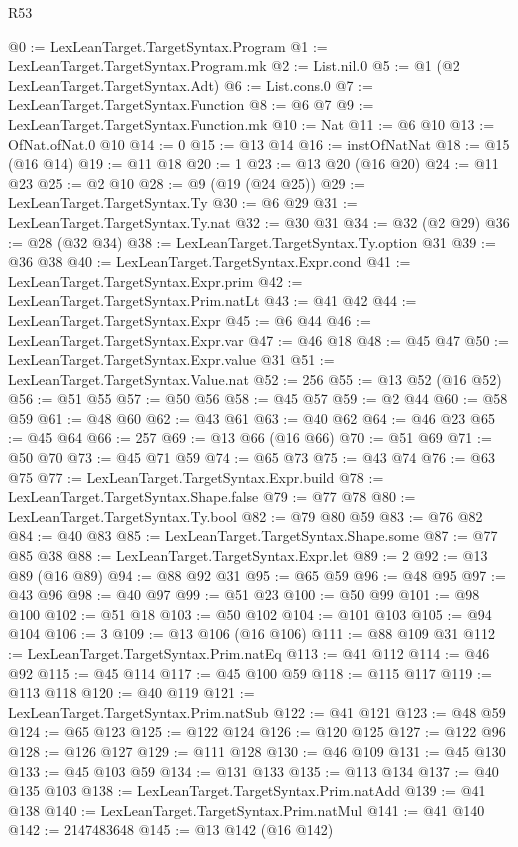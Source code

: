 \begin{lexlean}{R53}
\begin{coremodule}
@0 := LexLeanTarget.TargetSyntax.Program
@1 := LexLeanTarget.TargetSyntax.Program.mk
@2 := List.nil.{0}
@5 := @1 (@2 LexLeanTarget.TargetSyntax.Adt)
@6 := List.cons.{0}
@7 := LexLeanTarget.TargetSyntax.Function
@8 := @6 @7
@9 := LexLeanTarget.TargetSyntax.Function.mk
@10 := Nat
@11 := @6 @10
@13 := OfNat.ofNat.{0} @10
@14 := 0
@15 := @13 @14
@16 := instOfNatNat
@18 := @15 (@16 @14)
@19 := @11 @18
@20 := 1
@23 := @13 @20 (@16 @20)
@24 := @11 @23
@25 := @2 @10
@28 := @9 (@19 (@24 @25))
@29 := LexLeanTarget.TargetSyntax.Ty
@30 := @6 @29
@31 := LexLeanTarget.TargetSyntax.Ty.nat
@32 := @30 @31
@34 := @32 (@2 @29)
@36 := @28 (@32 @34)
@38 := LexLeanTarget.TargetSyntax.Ty.option @31
@39 := @36 @38
@40 := LexLeanTarget.TargetSyntax.Expr.cond
@41 := LexLeanTarget.TargetSyntax.Expr.prim
@42 := LexLeanTarget.TargetSyntax.Prim.natLt
@43 := @41 @42
@44 := LexLeanTarget.TargetSyntax.Expr
@45 := @6 @44
@46 := LexLeanTarget.TargetSyntax.Expr.var
@47 := @46 @18
@48 := @45 @47
@50 := LexLeanTarget.TargetSyntax.Expr.value @31
@51 := LexLeanTarget.TargetSyntax.Value.nat
@52 := 256
@55 := @13 @52 (@16 @52)
@56 := @51 @55
@57 := @50 @56
@58 := @45 @57
@59 := @2 @44
@60 := @58 @59
@61 := @48 @60
@62 := @43 @61
@63 := @40 @62
@64 := @46 @23
@65 := @45 @64
@66 := 257
@69 := @13 @66 (@16 @66)
@70 := @51 @69
@71 := @50 @70
@73 := @45 @71 @59
@74 := @65 @73
@75 := @43 @74
@76 := @63 @75
@77 := LexLeanTarget.TargetSyntax.Expr.build
@78 := LexLeanTarget.TargetSyntax.Shape.false
@79 := @77 @78
@80 := LexLeanTarget.TargetSyntax.Ty.bool
@82 := @79 @80 @59
@83 := @76 @82
@84 := @40 @83
@85 := LexLeanTarget.TargetSyntax.Shape.some
@87 := @77 @85 @38
@88 := LexLeanTarget.TargetSyntax.Expr.let
@89 := 2
@92 := @13 @89 (@16 @89)
@94 := @88 @92 @31
@95 := @65 @59
@96 := @48 @95
@97 := @43 @96
@98 := @40 @97
@99 := @51 @23
@100 := @50 @99
@101 := @98 @100
@102 := @51 @18
@103 := @50 @102
@104 := @101 @103
@105 := @94 @104
@106 := 3
@109 := @13 @106 (@16 @106)
@111 := @88 @109 @31
@112 := LexLeanTarget.TargetSyntax.Prim.natEq
@113 := @41 @112
@114 := @46 @92
@115 := @45 @114
@117 := @45 @100 @59
@118 := @115 @117
@119 := @113 @118
@120 := @40 @119
@121 := LexLeanTarget.TargetSyntax.Prim.natSub
@122 := @41 @121
@123 := @48 @59
@124 := @65 @123
@125 := @122 @124
@126 := @120 @125
@127 := @122 @96
@128 := @126 @127
@129 := @111 @128
@130 := @46 @109
@131 := @45 @130
@133 := @45 @103 @59
@134 := @131 @133
@135 := @113 @134
@137 := @40 @135 @103
@138 := LexLeanTarget.TargetSyntax.Prim.natAdd
@139 := @41 @138
@140 := LexLeanTarget.TargetSyntax.Prim.natMul
@141 := @41 @140
@142 := 2147483648
@145 := @13 @142 (@16 @142)

\end{coremodule}
\end{lexlean}
